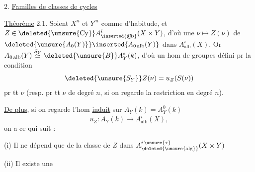 2. \uline{Familles de classes de cycles  }

\uline{Théorème} 2.1. Soient \(X^n\) et \(Y^m\) comme d'habitude, et \(Z\in\deleted{\unsure{\operatorname{Cy}}}A^i_{\inserted{\text{\textcircled{alb}}}}(X\times Y)\), d'où une  \(\nu\longmapsto Z(\nu)\) de \(\deleted{\unsure{A_0(Y)}}\inserted{A_{0\,\mathrm{alb}}(Y)}\) dans \(A^i_{\mathrm{alb}}(X)\).
Or \(A_{0\,\mathrm{alb}}(Y)\overset{S_Y}{\simeq}\deleted{\unsure{B}}A_Y^*(k)\), d'où un hom de groupes
 défini pr la condition
\[
\deleted{\unsure{S_Y}}Z(\nu)=u_Z(S(\nu))
\]
pr tt \(\nu\) (resp. pr tt \(\nu\) de degré \(n\), si on regarde la restriction en degré \(n\)).

\uline{De plus}, si on regarde l'hom \uline{induit} sur \(A_Y(k)=A_Y^0(k)\)
\[
u_Z:A_Y(k)\longrightarrow A^i_{\mathrm{alb}}(X),
\]
on a ce qui suit : 

(i) Il ne dépend que de la classe de \(Z\) dans \(A^{i\,\unsure{\tau}}_{\deleted{\unsure{\mathrm{alg}}}}(X\times Y)\)
\margin{[À \unsure{réserver} pr plus tard}

(ii) Il existe une 
